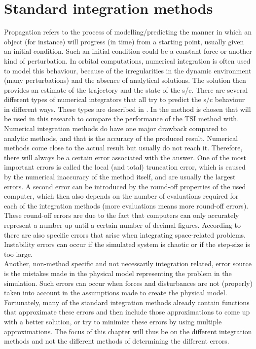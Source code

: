 \chapter{Standard integration methods}


\label{ch:standardintegrationmethods}
Propagation refers to the process of modelling/predicting the manner in which an object (for instance) will progress (in time) from a starting point, usually given an initial condition. Such an initial condition could be a constant force or another kind of perturbation. In orbital computations, numerical integration is often used to model this behaviour, because of the irregularities in the dynamic environment (many perturbations) and the absence of analytical solutions. The solution then provides an estimate of the trajectory and the state of the \ac{s/c}\citep{hofsteenge2013}. There are several different types of numerical integrators that all try to predict the \ac{s/c} behaviour in different ways. These types are described in . In  the method is chosen that will be used in this research to compare the performance of the \ac{TSI} method with. \\
Numerical integration methods do have one major drawback compared to analytic methods, and that is the accuracy of the produced result. Numerical methods come close to the actual result but usually do not reach it. Therefore, there will always be a certain error associated with the answer. One of the most important errors is called the local (and total) truncation error, which is caused by the numerical inaccuracy of the method itself, and are usually the largest errors. A second error can be introduced by the round-off properties of the used computer, which then also depends on the number of evaluations required for each of the integration methods (more evaluations means more round-off errors). These round-off errors are due to the fact that computers can only accurately represent a number up until a certain number of decimal figures. According to \cite{milani1987} there are also specific errors that arise when integrating space-related problems. Instability errors can occur if the simulated system is chaotic or if the step-size is too large.\\
Another, non-method specific and not necessarily integration related, error source is the mistakes made in the physical model representing the problem in the simulation. Such errors can occur when forces and disturbances are not (properly) taken into account in the assumptions made to create the physical model.\\
Fortunately, many of the standard integration methods already contain functions that approximate these errors and then include those approximations to come up with a better solution, or try to minimize these errors by using multiple approximations. The focus of this chapter will thus be on the different integration methods and not the different methods of determining the different errors.

